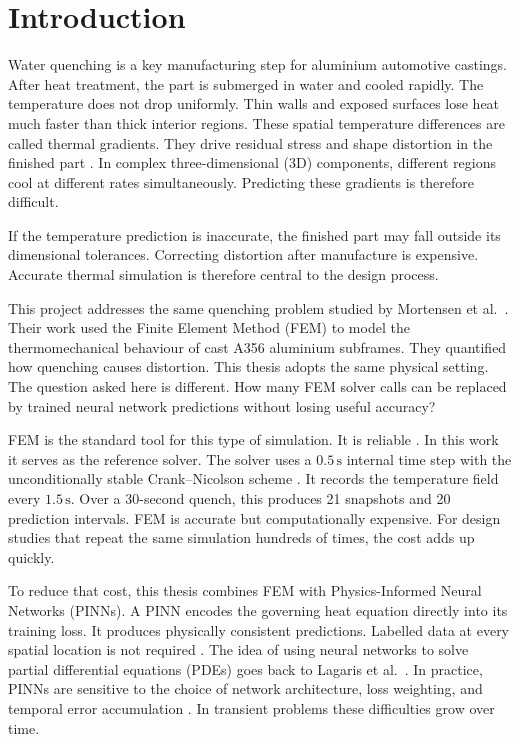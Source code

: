 \chapter{Introduction}
\label{chap:intro}

Water quenching is a key manufacturing step for aluminium automotive castings.
After heat treatment, the part is submerged in water and cooled rapidly.
The temperature does not drop uniformly.
Thin walls and exposed surfaces lose heat much faster than thick interior regions.
These spatial temperature differences are called thermal gradients.
They drive residual stress and shape distortion in the finished part
\cite{xiao2010,wang2019quenching,mortensen2026}.
In complex three-dimensional (3D) components, different regions cool at
different rates simultaneously.
Predicting these gradients is therefore difficult.

If the temperature prediction is inaccurate, the finished part may fall outside
its dimensional tolerances.
Correcting distortion after manufacture is expensive.
Accurate thermal simulation is therefore central to the design process.

This project addresses the same quenching problem studied by Mortensen
et al.~\cite{mortensen2026}.
Their work used the Finite Element Method (FEM) to model the thermomechanical
behaviour of cast A356 aluminium subframes.
They quantified how quenching causes distortion.
This thesis adopts the same physical setting.
The question asked here is different.
How many FEM solver calls can be replaced by trained neural network predictions
without losing useful accuracy?

FEM is the standard tool for this type of simulation.
It is reliable \cite{wilson1966,mackerle2003,grossmann2024fem}.
In this work it serves as the reference solver.
The solver uses a $0.5\,\mathrm{s}$ internal time step with the
unconditionally stable Crank--Nicolson scheme \cite{grossmann2024fem}.
It records the temperature field every $1.5\,\mathrm{s}$.
Over a 30-second quench, this produces 21 snapshots and 20 prediction
intervals.
FEM is accurate but computationally expensive.
For design studies that repeat the same simulation hundreds of times, the
cost adds up quickly.

To reduce that cost, this thesis combines FEM with Physics-Informed Neural
Networks (PINNs).
A PINN encodes the governing heat equation directly into its training loss.
It produces physically consistent predictions.
Labelled data at every spatial location is not required
\cite{raissi2019,karniadakis2021,zhao2025heattransfer}.
The idea of using neural networks to solve partial differential equations
(PDEs) goes back to Lagaris et al.~\cite{lagaris1998}.
In practice, PINNs are sensitive to the choice of network architecture,
loss weighting, and temporal error accumulation
\cite{wang2021,wang2022ntk,mcclenny2023,guo2023transientheat}.
In transient problems these difficulties grow over time.

